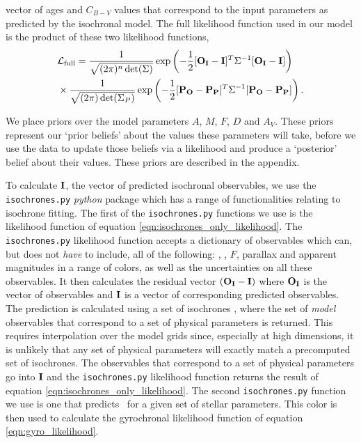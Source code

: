 vector of ages and $C_{B-V}$ values that correspond to the input parameters
as predicted by the isochronal model.
The full likelihood function used in our model is the product of these two
likelihood functions,
\begin{eqnarray} \label{eqn:full_likelihood}
    & \mathcal{L_{\mathrm{full}}} = \frac{1}{\sqrt{(2\pi)^n \det(\Sigma)}}
    \exp\left( -\frac{1}{2} [{\bf O_I} - {\bf I}]^T \Sigma ^{-1}
    [{\bf O_I} - {\bf I}]\right) \\ \nonumber
    & \times
    \frac{1}{\sqrt{(2\pi) \det(\Sigma_P)}}
    \exp\left( -\frac{1}{2} [{\bf P_O} - {\bf P_P}]^T \Sigma ^{-1}
    [{\bf P_O} - {\bf P_P}]\right).
\end{eqnarray}

We place priors over the model parameters $A$, $M$, $F$, $D$ and $A_V$.
These priors represent our `prior beliefs' about the values these parameters
will take, before we use the data to update those beliefs via a likelihood and
produce a `posterior' belief about their values.
These priors are described in the appendix.

To calculate ${\bf I}$, the vector of predicted isochronal observables, we use
the {\tt isochrones.py} {\it python} package which has a range of
functionalities relating to isochrone fitting.
The first of the {\tt isochrones.py} functions we use is the likelihood
function of equation \ref{eqn:isochrones_only_likelihood}.
The {\tt isochrones.py} likelihood function accepts a dictionary of
observables which can, but does not {\it have} to include, all of the
following: \teff, \logg, $F$, parallax and apparent magnitudes in a range of
colors, as well as the uncertainties on all these observables.
It then calculates the residual vector $({\bf O_I} - {\bf I})$ where ${\bf
O_I}$ is the vector of observables and ${\bf I}$ is a vector of corresponding
predicted observables.
The prediction is calculated using a set of isochrones \citep[we use the MIST
models,][]{paxton2011, paxton2013, paxton2015, dotter2016, choi2016, paxton2018},
where the set of {\it model} observables that correspond
to a set of physical parameters is returned.
This requires interpolation over the model grids since, especially at high
dimensions, it is unlikely that any set of physical parameters will exactly
match a precomputed set of isochrones.
The observables that correspond to a set of physical parameters go into ${\bf
I}$ and the {\tt isochrones.py} likelihood function returns the result of
equation \ref{eqn:isochrones_only_likelihood}.
The second {\tt isochrones.py} function we use is one that predicts \cbv\ for
a given set of stellar parameters.
This color is then used to calculate the gyrochronal likelihood function of
equation \ref{eqn:gyro_likelihood}.

